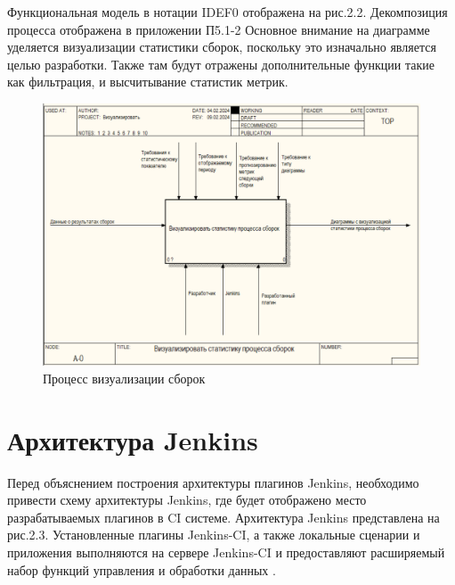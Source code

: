 Функциональная модель в нотации IDEF0 отображена на рис.2.2. Декомпозиция процесса отображена в приложении П5.1-2 Основное внимание на диаграмме уделяется визуализации статистики сборок, поскольку это изначально является целью разработки. Также там будут отражены дополнительные функции такие как фильтрация, и высчитывание статистик метрик.

\begin{figure}[ht!] 
	\center
	\includegraphics [scale=0.7] {my_folder/images//ide1_2}
	\caption{Процесс визуализации сборок} 
	\label{fig:er1}  
\end{figure}

\section{Архитектура Jenkins} \label{ch1:sec2}

Перед объяснением построения архитектуры плагинов Jenkins, необходимо привести схему архитектуры Jenkins, где будет отображено место разрабатываемых плагинов в CI системе. Архитектура Jenkins представлена на рис.2.3. Установленные плагины Jenkins-CI, а также локальные сценарии и приложения выполняются на сервере Jenkins-CI и предоставляют расширяемый набор функций управления и обработки данных \cite{article}.


